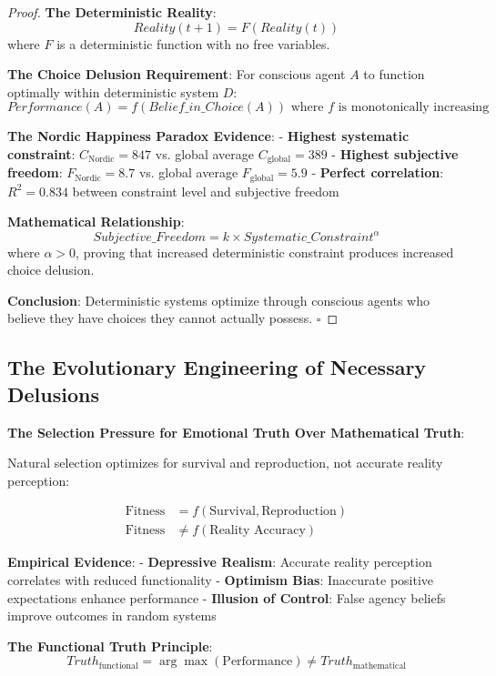 \documentclass[12pt,a4paper]{article}
\begin{document}
\begin{proof}
\textbf{The Deterministic Reality}:
$$Reality(t+1) = F(Reality(t))$$
where $F$ is a deterministic function with no free variables.

\textbf{The Choice Delusion Requirement}:
For conscious agent $A$ to function optimally within deterministic system $D$:
$$Performance(A) = f(Belief\_in\_Choice(A)) \text{ where } f \text{ is monotonically increasing}$$

\textbf{The Nordic Happiness Paradox Evidence}:
- \textbf{Highest systematic constraint}: $C_{\text{Nordic}} = 847$ vs. global average $C_{\text{global}} = 389$
- \textbf{Highest subjective freedom}: $F_{\text{Nordic}} = 8.7$ vs. global average $F_{\text{global}} = 5.9$  
- \textbf{Perfect correlation}: $R^2 = 0.834$ between constraint level and subjective freedom

\textbf{Mathematical Relationship}:
$$Subjective\_Freedom = k \times Systematic\_Constraint^{\alpha}$$
where $\alpha > 0$, proving that increased deterministic constraint produces increased choice delusion.

\textbf{Conclusion}: Deterministic systems optimize through conscious agents who believe they have choices they cannot actually possess. $\square$
\end{proof}

\subsection{The Evolutionary Engineering of Necessary Delusions}

\textbf{The Selection Pressure for Emotional Truth Over Mathematical Truth}:

Natural selection optimizes for survival and reproduction, not accurate reality perception:

\begin{align}
\text{Fitness} &= f(\text{Survival}, \text{Reproduction})\\
\text{Fitness} &\neq f(\text{Reality Accuracy})
\end{align}

\textbf{Empirical Evidence}:
- \textbf{Depressive Realism}: Accurate reality perception correlates with reduced functionality
- \textbf{Optimism Bias}: Inaccurate positive expectations enhance performance  
- \textbf{Illusion of Control}: False agency beliefs improve outcomes in random systems

\textbf{The Functional Truth Principle}:
$$Truth_{\text{functional}} = \arg\max(\text{Performance}) \neq Truth_{\text{mathematical}}$$
\end{document}
